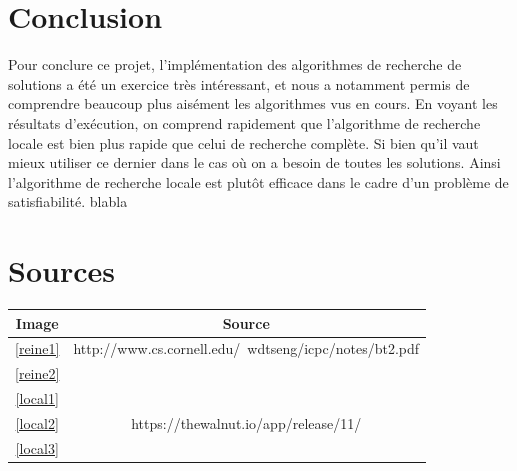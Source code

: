 \documentclass{article}
\begin{document}
\section{Conclusion}
Pour conclure ce projet, l'implémentation des algorithmes de recherche de solutions a été un exercice très intéressant, et nous a notamment permis de comprendre beaucoup plus aisément les algorithmes vus en cours. En voyant les résultats d'exécution, on comprend rapidement que l'algorithme de recherche locale est bien plus rapide que celui de recherche complète. Si bien qu'il vaut mieux utiliser ce dernier dans le cas où on a besoin de toutes les solutions. Ainsi l'algorithme de recherche locale est plutôt efficace dans le cadre d'un problème de satisfiabilité. blabla
\section{Sources}

\begin{tabular}{|c|c|}
\hline
Image & Source \\
\hline
\ref{reine1} & http://www.cs.cornell.edu/~wdtseng/icpc/notes/bt2.pdf \\
\ref{reine2} &  \\
\hline
\ref{local1} & \\
\ref{local2} &  https://thewalnut.io/app/release/11/ \\
\ref{local3} &  \\
\hline
\end{tabular}

\end{document}
